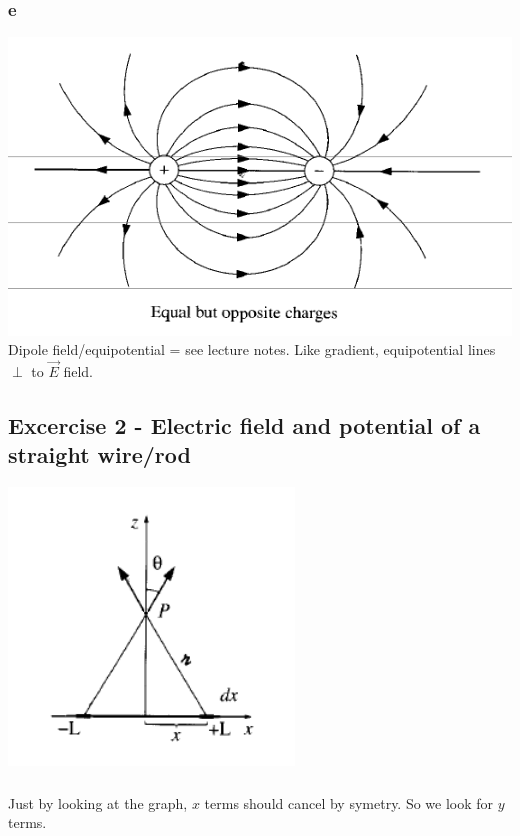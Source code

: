 \subsubsection{e}
\includegraphics[scale=0.7]{img/3_1_e}
Dipole field/equipotential = see lecture notes.
Like gradient, equipotential lines \(\perp\) to \(\vec{E}\) field.

\subsection{Excercise 2 - Electric field and potential of a straight wire/rod}

\includegraphics{img/3_2}

\subsubsection{}
Just by looking at the graph, \(x\) terms should cancel by symetry. So we look
for \(y\) terms.

